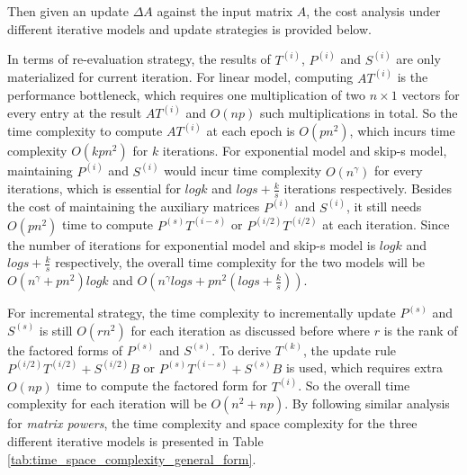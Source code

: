 Then given an update $\Delta A$ against the input matrix $A$, the cost analysis under different iterative models and update strategies is provided below.

In terms of re-evaluation strategy, the results of $T^{(i)}$, $P^{(i)}$ and $S^{(i)}$ are only materialized for current iteration. For linear model, computing $AT^{(i)}$ is the performance bottleneck, which requires one multiplication of two $n \times 1$ vectors for every entry at the result $AT^{(i)}$ and $O(np)$ such multiplications in total. So the time complexity to compute $AT^{(i)}$ at each epoch is $O(pn^2)$, which incurs time complexity $O(kpn^2)$ for $k$ iterations. For exponential model and skip-s model, maintaining $P^{(i)}$ and $S^{(i)}$ would incur time complexity $O(n^{\gamma})$ for every iterations, which is essential for $logk$ and $logs + \frac{k}{s}$ iterations respectively. Besides the cost of maintaining the auxiliary matrices $P^{(i)}$ and $S^{(i)}$, it still needs $O(pn^2)$ time to compute $P^{(s)}T^{(i-s)}$ or $P^{(i/2)}T^{(i/2)}$ at each iteration. Since the number of iterations for exponential model and skip-s model is $logk$ and $logs + \frac{k}{s}$ respectively, the overall time complexity for the two models will be $O(n^{\gamma} + pn^2)logk$ and $O(n^{\gamma}logs + pn^2(logs+ \frac{k}{s}))$.

For incremental strategy, the time complexity to incrementally update $P^{(s)}$ and $S^{(s)}$ is still $O(rn^2)$ for each iteration as discussed before where $r$ is the rank of the factored forms of $P^{(s)}$ and $S^{(s)}$. To derive $T^{(k)}$, the update rule $P^{(i/2)}T^{(i/2)} + S^{(i/2)}B$ or $P^{(s)}T^{(i-s)} + S^{(s)}B$ is used, which requires extra $O(np)$ time to compute the factored form for $T^{(i)}$. So the overall time complexity for each iteration will be $O(n^2 + np)$. By following similar analysis for {\em matrix powers}, the time complexity and space complexity for the three different iterative models is presented in Table \ref{tab:time_space_complexity_general_form}.

